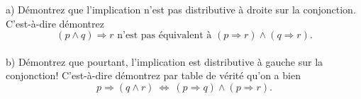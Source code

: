 \documentclass[12pt]{article}
\newcommand{\REMISE}[1]{}
\newcommand{\rouge}[1]{\textcolor{red}{#1}}
\newcommand{\V}{\mbox{\tt v}}
\newcommand{\F}{\mbox{\tt f}}
\newcommand{\non}{\neg}                  %
\newcommand{\et}{\wedge}                 %
\newcommand{\ou}{\vee}                   %
\newcommand{\implique}{\Rightarrow}      %
\newcommand{\ssi}{\Leftrightarrow}       %
\newcounter{exercice}\newcommand{\exercice}{\bigskip \addtocounter{exercice}{1}\noindent \textbf{Exercice \theexercice}\\}
\newcommand{\reponse}[1]{\REMISE{\vspace{.5cm}\noindent\textbf{Réponse : } #1 \vfill}}
\begin{document}
\exercice
a) Démontrez que l'implication n'est pas distributive à droite sur la conjonction. C'est-à-dire démontrez
$$(p\wedge q)\implique r \mbox{ n'est pas équivalent à } (p\implique r ) \wedge (q\implique r).$$
\\b) Démontrez que pourtant,  l'implication est  distributive à gauche sur la conjonction! C'est-à-dire démontrez par table de vérité qu'on a bien
$$p\implique (q\wedge r)\  \ssi\  (p\implique q ) \wedge (p\implique r).$$
\reponse{
}

\end{document}
